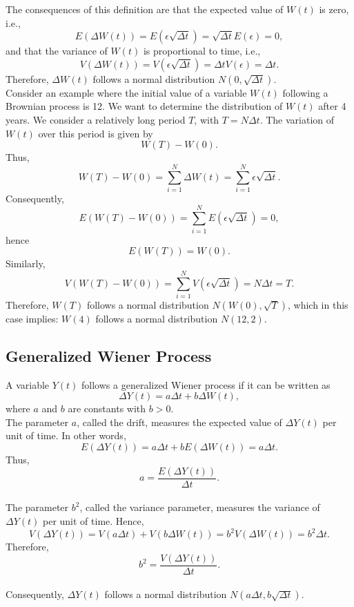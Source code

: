 \documentclass[a4paper,10pt]{article}
\begin{document}
\noindent The consequences of this definition are that the expected value of \( W(t) \) is zero, i.e., \[ E(\Delta W(t)) = E(\epsilon \sqrt{\Delta t}) = \sqrt{\Delta t} E(\epsilon) = 0, \] and that the variance of \( W(t) \) is proportional to time, i.e., \[ V(\Delta W(t)) = V(\epsilon \sqrt{\Delta t}) = \Delta t V(\epsilon) = \Delta t. \] Therefore, \( \Delta W(t) \) follows a normal distribution \( N(0, \sqrt{\Delta t}) \). \\

\noindent Consider an example where the initial value of a variable \( W(t) \) following a Brownian process is 12. We want to determine the distribution of \( W(t) \) after 4 years. We consider a relatively long period \( T \), with \( T = N \Delta t \). The variation of \( W(t) \) over this period is given by \[ W(T) - W(0). \] Thus, \[ W(T) - W(0) = \sum_{i=1}^{N} \Delta W(t) = \sum_{i=1}^{N} \epsilon \sqrt{\Delta t}. \] Consequently, \[ E(W(T) - W(0)) = \sum_{i=1}^{N} E(\epsilon \sqrt{\Delta t}) = 0, \] hence \[ E(W(T)) = W(0). \] Similarly, \[ V(W(T) - W(0)) = \sum_{i=1}^{N} V(\epsilon \sqrt{\Delta t}) = N \Delta t = T. \] Therefore, \( W(T) \) follows a normal distribution \( N(W(0), \sqrt{T}) \), which in this case implies: \( W(4) \) follows a normal distribution \( N(12, 2) \). \\

\subsection{Generalized Wiener Process}
\noindent A variable \( Y(t) \) follows a generalized Wiener process if it can be written as \[ \Delta Y(t) = a \Delta t + b \Delta W(t), \] where \( a \) and \( b \) are constants with \( b > 0 \). \\

\noindent The parameter \( a \), called the drift, measures the expected value of \( \Delta Y(t) \) per unit of time. In other words, \[ E(\Delta Y(t)) = a \Delta t + b E(\Delta W(t)) = a \Delta t. \] Thus, \[ a = \frac{E(\Delta Y(t))}{\Delta t}. \] \\

\noindent The parameter \( b^2 \), called the variance parameter, measures the variance of \( \Delta Y(t) \) per unit of time. Hence, \[ V(\Delta Y(t)) = V(a \Delta t) + V(b \Delta W(t)) = b^2 V(\Delta W(t)) = b^2 \Delta t. \] Therefore, \[ b^2 = \frac{V(\Delta Y(t))}{\Delta t}. \] \\

\noindent Consequently, \( \Delta Y(t) \) follows a normal distribution \( N(a \Delta t, b \sqrt{\Delta t}) \). \\
\end{document}
